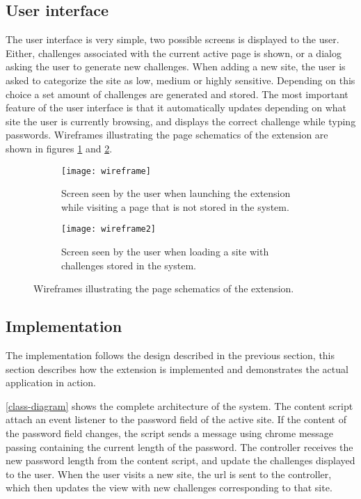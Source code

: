 \subsection{User interface}
The user interface is very simple, two possible screens is displayed to the user. Either, challenges associated with the current active page is shown, or a dialog asking the user to generate new challenges. When adding a new site, the user is asked to categorize the site as low, medium or highly sensitive. Depending on this choice a set amount of challenges are generated and stored. The most important feature of the user interface is that it automatically updates depending on what site the user is currently browsing, and displays the correct challenge while typing passwords. Wireframes illustrating the page schematics of the extension are shown in figures \ref{add-new-screen} and \ref{challenge-screen}. 

\begin{figure}[ht]
    \centering
    \begin{subfigure}[t]{0.45\textwidth}
        \centering
        \texttt{[image: wireframe]} 
        \caption{Screen seen by the user when launching the extension while visiting a page that is not stored in the system.}
        \label{add-new-screen}
    \end{subfigure}
    \hfill
    \begin{subfigure}[t]{0.45\textwidth}
        \centering
        \texttt{[image: wireframe2]} 
        \caption{Screen seen by the user when loading a site with challenges stored in the system. }
        \label{challenge-screen}
    \end{subfigure}
    \caption{Wireframes illustrating the page schematics of the extension.}
    \label{wireframes}
\end{figure}

\subsection{Implementation}
The implementation follows the design described in the previous section, this section describes how the extension is implemented and demonstrates the actual application in action. 


\par \autoref{class-diagram} shows the complete architecture of the system.
 The content script attach an event listener to the password field of the active site. If the content of the password field changes, the script sends a message using chrome message passing containing the current length of the password. The controller receives the new password length from the content script, and update the challenges displayed to the user. When the user visits a new site, the url is sent to the controller, which then updates the view with new challenges corresponding to that site.

